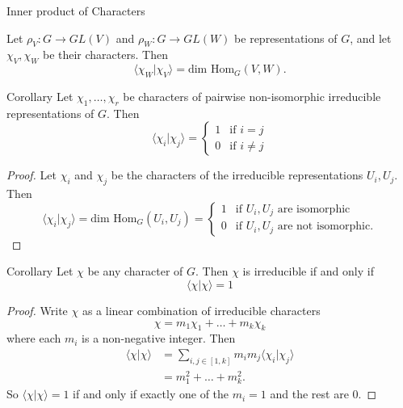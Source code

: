 \begin{frame}{Inner product of Characters}
\begin{theorem}
Let $\rho_V \colon G \to GL(V)$ and $\rho_W \colon G \to GL(W)$ be representations of $G$, and let $\chi_V, \chi_W$ be their characters.  Then 
\[ \langle \chi_W | \chi_V \rangle = \text{dim Hom}_G (V,W). \]
\end{theorem}
\end{frame}

\begin{frame}
\begin{block}{Corollary}
Let $\chi_1, \ldots, \chi_r$ be characters of pairwise non-isomorphic irreducible representations of $G$.  Then
\[ \langle \chi_i | \chi_j \rangle = \begin{cases}  1 &\text{if } i = j \\ 0 &\text{if } i \neq j\end{cases} \]
\end{block}
\begin{proof}
Let $\chi_i$ and $\chi_j$ be the characters of the irreducible representations $U_i, U_j$.  Then
\[ \langle \chi_i | \chi_j \rangle = \text{dim Hom}_G (U_i, U_j) = \begin{cases}  1 &\text{if }U_i, U_j \text{ are isomorphic} \\  0 &\text{if }U_i, U_j \text{ are not isomorphic}. \end{cases} \]
\end{proof}
\end{frame}

\begin{frame}
\begin{block}{Corollary}
Let $\chi$ be any character of $G$.    Then $\chi$ is irreducible if and only if \[ \langle \chi | \chi \rangle = 1\]
\end{block}
\begin{proof}
Write $\chi$ as a linear combination of irreducible characters \[ \chi = m_1 \chi_1 + \ldots + m_k \chi_k \] where each $m_i$ is a non-negative integer.  Then
\begin{align*}
\langle \chi | \chi \rangle &= \sum_{i,j \in [1, k]} m_i m_j \langle \chi_i | \chi_j \rangle \\
&= m_1^2 + \ldots + m_k^2.
\end{align*}
So $\langle \chi | \chi \rangle = 1$ if and only if exactly one of the $m_i = 1$ and the rest are $0$.
\end{proof}
\end{frame}

